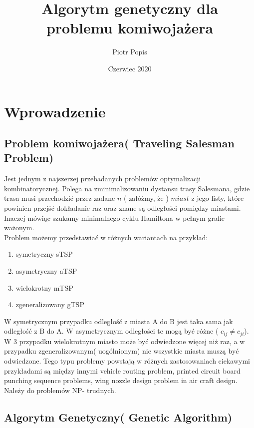 \documentclass[11pt]{article}
\title{Algorytm genetyczny dla \\ problemu komiwojażera}
\author{Piotr Popis}
\date{Czerwiec 2020}
\begin{document}
\begin{titlepage}
\maketitle
\end{titlepage}
\section{Wprowadzenie}
\subsection{Problem komiwojażera( Traveling Salesman Problem)}
Jest jednym z najszerzej przebadanych problemów optymalizacji kombinatorycznej. Polega na zminimalizowaniu dystansu trasy Salesmana, gdzie trasa musi przechodzić przez zadane $n$ ( załóżmy, że ) $miast$ z jego listy, które powinien przejść dokładanie raz oraz znane są odległości pomiędzy miastami. Inaczej mówiąc szukamy minimalnego cyklu Hamiltona w pełnym grafie ważonym.\\
Problem możemy przedstawiać w różnych wariantach na przykład:
\begin{enumerate}
\item symetryczny sTSP
\item asymetryczny aTSP
\item wielokrotny mTSP
\item zgeneralizowany gTSP
\end{enumerate}
W symetrycznym przypadku odległość z miasta A do B jest taka sama jak odległość z B do A. W asymetrycznym odległości te mogą być różne ( $c_{ij} \neq c_{ji}$). W 3 przypadku wielokrotnym miasto może być odwiedzone więcej niż raz, a w przypadku zgeneralizowanym( uogólnionym) nie wszystkie miasta muszą być odwiedzone.
   Tego typu problemy powstają w różnych zastosowaniach ciekawymi przykładami są między innymi vehicle routing problem, printed circuit board punching sequence problems, wing nozzle design problem in air craft design. Należy do problemów NP- trudnych.
\subsection{Algorytm Genetyczny( Genetic Algorithm)}
\end{document}
